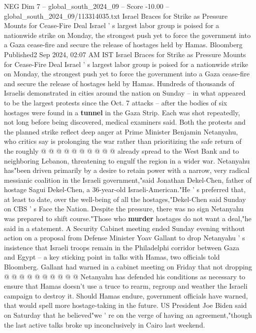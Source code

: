 \begin{textsample}{NEG Dim 7 – global\_south\_2024\_09 – Score -10.00 – global\_south\_2024\_09/113314035.txt}  \label{ex:f7_neg_171}
Israel Braces for Strike as Pressure Mounts for Cease-Fire Deal Israel ' s largest labor group is poised for a nationwide strike on Monday, the strongest push yet to force the government into a Gaza cease-fire and secure the release of hostages held by Hamas.
Bloomberg Published2 Sep 2024, 02:07 AM IST Israel Braces for Strike as Pressure Mounts for Cease-Fire Deal Israel ' s largest labor group is poised for a nationwide strike on Monday, the strongest push yet to force the government into a Gaza cease-fire and secure the release of hostages held by Hamas.
Hundreds of thousands of Israelis demonstrated in cities around the nation on Sunday -- in what appeared to be the largest protests since the Oct. 7 attacks -- after the bodies of six hostages were found in a \textbf{tunnel} in the Gaza Strip.
Each was shot repeatedly, not long before being discovered, medical examiners said.
Both the protests and the planned strike reflect deep anger at Prime Minister Benjamin Netanyahu, who critics say is prolonging the war rather than prioritizing the safe return of the roughly @ @ @ @ @ @ @ @ @ @ already spread to the West Bank and to neighboring Lebanon, threatening to engulf the region in a wider war.
Netanyahu has"been driven primarily by a desire to retain power with a narrow, very radical messianic coalition in the Israeli government,"said Jonathan Dekel-Chen, father of hostage Sagui Dekel-Chen, a 36-year-old Israeli-American."He ' s preferred that, at least to date, over the well-being of all the hostages,"Dekel-Chen said Sunday on CBS ' s Face the Nation.
Despite the pressure, there was no sign Netanyahu was prepared to shift course."Those who \textbf{murder} hostages do not want a deal,"he said in a statement.
A Security Cabinet meeting ended Sunday evening without action on a proposal from Defense Minister Yoav Gallant to drop Netanyahu ' s insistence that Israeli troops remain in the Philadelphi corridor between Gaza and Egypt -- a key sticking point in talks with Hamas, two officials told Bloomberg.
Gallant had warned in a cabinet meeting on Friday that not dropping @ @ @ @ @ @ @ @ @ @ Netanyahu has defended his conditions as necessary to ensure that Hamas doesn't use a truce to rearm, regroup and weather the Israeli campaign to destroy it.
Should Hamas endure, government officials have warned, that would spell more hostage-taking in the future.
US President Joe Biden said on Saturday that he believed"we ' re on the verge of having an agreement,"though the last active talks broke up inconclusively in Cairo last weekend.

\end{textsample}
